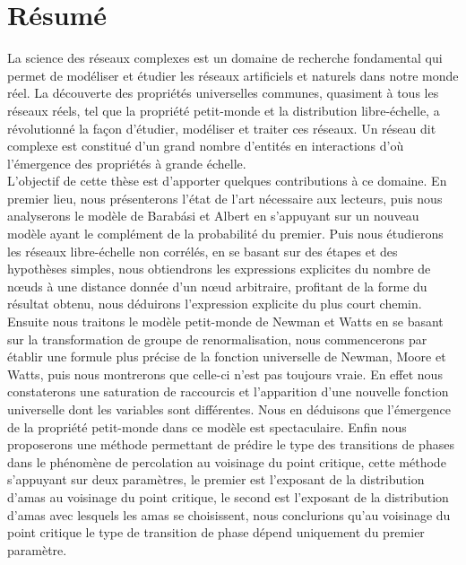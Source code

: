 %
%
\chapter*{Résumé}
 La science des réseaux complexes est un domaine de recherche fondamental qui permet de modéliser et étudier les réseaux artificiels et naturels dans notre monde réel. La découverte
 des propriétés universelles communes, quasiment à tous les réseaux réels, tel que la propriété petit-monde et la distribution libre-échelle, a révolutionné la façon
 d’étudier, modéliser et traiter ces réseaux.
 Un réseau dit complexe est constitué d'un grand nombre d'entités en interactions d’où l’émergence
 des propriétés à grande échelle.\\ L'objectif de cette thèse est d'apporter quelques contributions à ce domaine. En premier lieu, nous présenterons l’état de l’art nécessaire aux lecteurs, puis nous analyserons le modèle de Barabási et Albert en s'appuyant sur un nouveau modèle ayant le complément de la probabilité du premier. Puis nous étudierons les réseaux libre-échelle non corrélés, en se basant sur des étapes et des hypothèses simples, nous obtiendrons les expressions explicites du nombre de nœuds à une distance donnée d'un nœud arbitraire, profitant de la forme du résultat obtenu, nous déduirons l'expression explicite du plus court chemin. Ensuite nous traitons le modèle petit-monde de Newman et Watts en se basant sur la transformation de groupe de renormalisation, nous commencerons par établir une formule plus précise de la fonction universelle de Newman, Moore et Watts, puis nous montrerons que celle-ci n'est pas toujours vraie. En effet nous constaterons une saturation de raccourcis et l'apparition d'une nouvelle fonction universelle dont les variables sont différentes. Nous en déduisons que l'émergence de la propriété petit-monde dans ce modèle est spectaculaire. Enfin nous proposerons une méthode permettant de prédire le type des transitions de phases  dans le phénomène de percolation au voisinage du point critique, cette méthode s'appuyant sur deux paramètres, le premier est l'exposant de la distribution d'amas au voisinage du point critique, le second est l'exposant de la distribution d'amas avec lesquels les amas se choisissent, nous conclurions qu'au voisinage du point critique le type de transition de phase dépend uniquement du premier paramètre. 